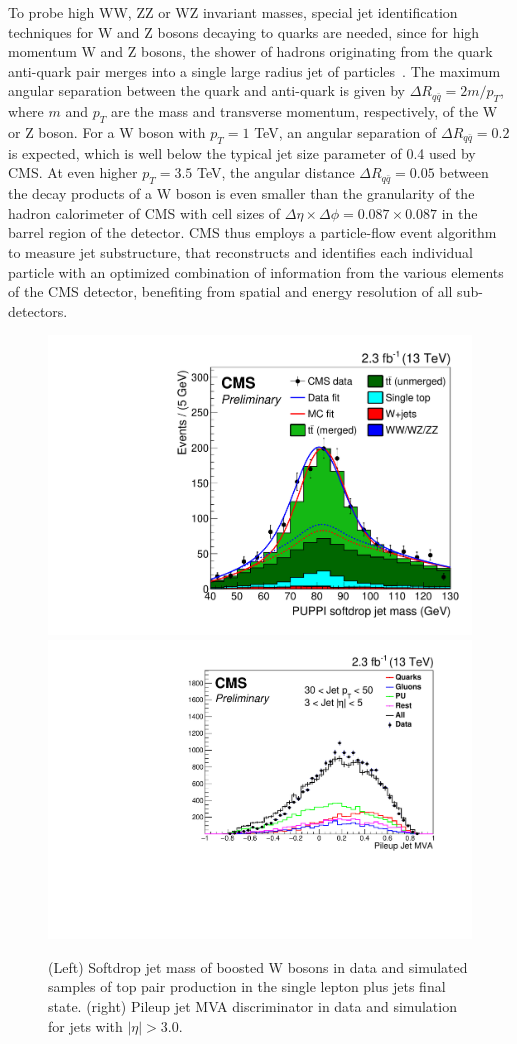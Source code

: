 To probe high WW, ZZ or WZ invariant masses, special jet identification techniques for W and Z bosons decaying to quarks are needed, since for high momentum W and Z bosons, the shower of hadrons originating from the quark anti-quark pair merges into a single large radius jet of particles~\cite{CMS-PAS-JME-16-003, CMS-PAS-JME-14-002, Khachatryan:2014vla}.
The maximum angular separation between the quark and anti-quark is given by $\Delta R_{q\bar{q}}=2 m / p_{T}$, where $m$ and $p_T$ are the mass and transverse momentum, respectively, of the W or Z boson.
For a W boson with $p_T=1$ TeV, an angular separation of  $\Delta R_{q\bar{q}}=0.2$ is expected, which is well below the typical jet size parameter of 0.4 used by CMS.
At even higher $p_T=3.5$ TeV, the angular distance $\Delta R_{q\bar{q}}=0.05$ between the decay products of a W boson is even smaller than the granularity of the hadron calorimeter of CMS with cell sizes of $\Delta \eta \times \Delta \phi = 0.087 \times 0.087$ in the barrel region of the detector.
CMS thus employs a particle-flow event algorithm~\cite{CMS-PRF-14-001} to measure jet substructure, that reconstructs and identifies each individual particle with an optimized combination of information from the various elements of the CMS detector, benefiting from spatial and energy resolution of all sub-detectors.

\begin{figure}[htb]
\includegraphics[width=.35\textwidth]{WG3_plots/CMS-PAS-JME-16-003_Figure_018-c}
\hfill
\includegraphics[width=.42\textwidth]{WG3_plots/CMS-PAS-JME-16-003_Figure_014-b}
\caption{(Left) Softdrop jet mass of boosted W bosons in data and simulated samples of top pair production in the single lepton plus jets final state.
(right) Pileup jet MVA discriminator in data and simulation for jets with $|\eta|>3.0$.}
\label{fig:CMSsubstructure}
\end{figure}

